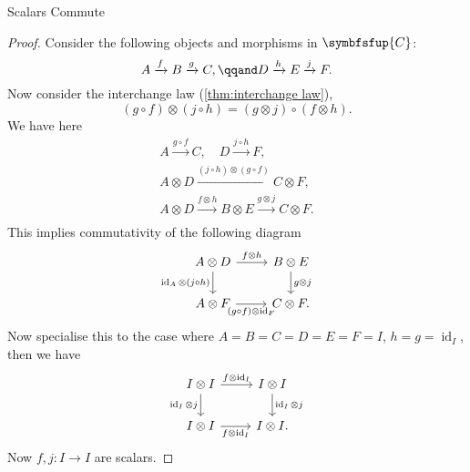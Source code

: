 \documentclass[fleqn]{NotesClass}
\newcommand{\cat}[1]{\symbfsfup{#1}}
\DeclareMathOperator{\id}{id}
\begin{document}
\begin{lma}{Scalars Commute}{}
\begin{proof}
            Consider the following objects and morphisms in \(\cat{C}\):
            \begin{equation}
                A \xrightarrow{f} B \xrightarrow{g} C, \qqand D \xrightarrow{h} E \xrightarrow{j} F.
            \end{equation}
            Now consider the interchange law (\cref{thm:interchange law}),
            \begin{equation}
                (g \circ f) \otimes (j \circ h) = (g \otimes j) \circ (f \otimes h).
            \end{equation}
            We have here
            \begin{gather}
                A \xrightarrow{g \circ f} C, \quad D \xrightarrow{j \circ h} F,\\
                A \otimes D \xrightarrow{(j \circ h) \otimes (g \circ f)} C \otimes F,\\
                A \otimes D \xrightarrow{f \otimes h} B \otimes E \xrightarrow{g \otimes j} C \otimes F.\\
            \end{gather}
            This implies commutativity of the following diagram
            \begin{equation}
                \begin{tikzcd}
                    A \otimes D \arrow[r, "f \otimes h"] \arrow[d, "\id_A \otimes (j \circ h)"'] & B \otimes E \arrow[d, "g \otimes j"]\\
                    A \otimes F \arrow[r, "(g \circ f) \otimes \id_F"'] & C \otimes F.
                \end{tikzcd}
            \end{equation}
            Now specialise this to the case where \(A = B = C = D = E = F = I\), \(h = g = \id_I\), then we have
            \begin{equation}
                \begin{tikzcd}
                    I \otimes I \arrow[r, "f \otimes \id_I"] \arrow[d, "\id_I \otimes j"'] & I \otimes I \arrow[d, "\id_I \otimes j"]\\
                    I \otimes I \arrow[r, "f \otimes \id_I"'] & I \otimes I.
                \end{tikzcd}
            \end{equation}
            Now \(f, j \colon I \to I\) are scalars.
            

\end{proof}
\end{lma}
\end{document}
